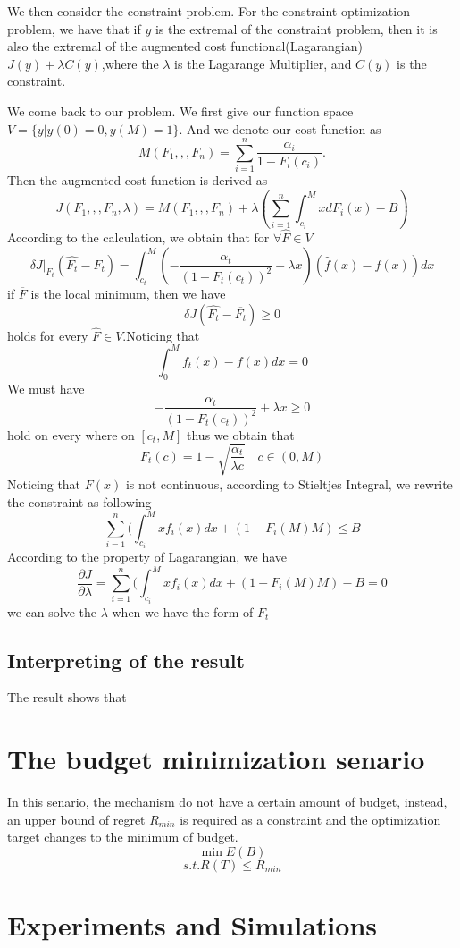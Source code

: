 \documentclass[10pt,conference,compsocconf,letterpaper]{IEEEtran}
\begin{document}
We then consider the constraint problem. For the constraint optimization problem, we have that if $y$ is the extremal of the constraint problem, then it is also the extremal of the augmented cost functional(Lagarangian) $J(y)+\lambda C(y)$,where the $\lambda$ is the Lagarange Multiplier, and $C(y)$ is the constraint.

We come back to our problem. We first give our function space $V=\{y|y(0)=0,y(M)=1\}$. And we denote our cost function as
\[M(F_1,,,F_n)= \sum_{i=1}^n \frac{\alpha_i}{1-F_i(c_i)}.\]
Then the augmented cost function is derived as
\[J(F_1,,,F_n,\lambda)=M(F_1,,,F_n)+\lambda( \sum_{i=1}^n\int_{c_i}^MxdF_i(x)-B) \]
According to the calculation, we obtain that for $\forall \hat{F}\in V$
\[\delta J|_{F_t}(\hat{F_t}-F_t)=\int_{c_t}^M(-\frac{\alpha_t}{(1-F_t(c_t))^2}+\lambda x)(\hat{f}(x)-f(x))dx\]
if $\overline{F}$ is the local minimum, then we have
\[\delta J(\hat{F_t}-\overline{F_t})\geq 0\]
holds for every $\hat{F}\in V$.Noticing that
\[\int_0^Mf_t(x)-f(x)dx=0\]
We must have 
\[-\frac{\alpha_t}{(1-F_t(c_t))^2}+\lambda x\geq 0\]
hold on every where on $[c_t,M]$
thus we obtain that
\[F_t(c)=1-\sqrt{\frac{\alpha_t}{\lambda c}}\quad c\in(0,M)\]
Noticing that $F(x)$ is not continuous, according to Stieltjes Integral, we rewrite the constraint as following
\[ \sum_{i=1}^n(\int_{c_i}^Mxf_i(x)dx+(1-F_i(M)M)\leq B\]
According to the property of Lagarangian, we have
\[\frac{\partial J}{\partial \lambda}=\sum_{i=1}^n(\int_{c_i}^Mxf_i(x)dx+(1-F_i(M)M)-B=0\]
we can solve the $\lambda$ when we have the form of $F_t$

\subsection{Interpreting of the result}
The result shows that

\section{The budget minimization senario}
In this senario, the mechanism do not have a certain amount of budget, instead, an upper bound of regret $R_{min}$ is required as a constraint and the optimization target changes to the minimum of budget.
\[\min E(B)\]
\[s.t. R(T)\leq R_{min}\]
\section{Experiments and Simulations}
\end{document}
